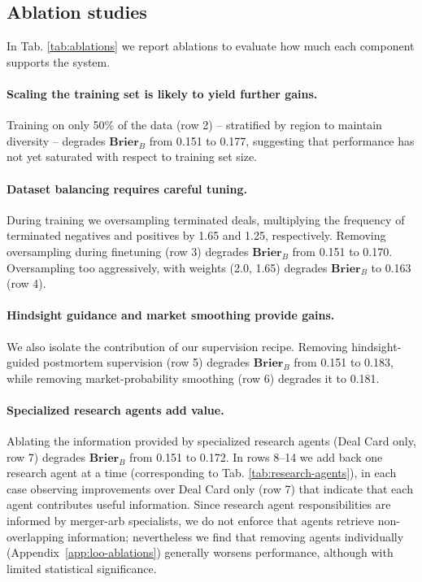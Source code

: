 \documentclass{article}
\theoremstyle{plain}
\theoremstyle{definition}
\theoremstyle{remark}
\begin{document}
\subsection{Ablation studies}
\label{sec:ablations}

In Tab. \ref{tab:ablations} we report ablations to evaluate how much each component supports the system. 

\paragraph{Scaling the training set is likely to yield further gains.}
Training on only 50\% of the data (row 2) -- stratified by region to maintain diversity -- degrades $\textbf{Brier}_B$ from 0.151 to 0.177, suggesting that performance has not yet saturated with respect to training set size.

\paragraph{Dataset balancing requires careful tuning.}
During training we oversampling terminated deals, multiplying the frequency of terminated negatives and positives by 1.65 and 1.25,
respectively. Removing oversampling during finetuning (row 3) degrades $\textbf{Brier}_B$ from 0.151 to 0.170. Oversampling too aggressively, with weights (2.0, 1.65) degrades $\textbf{Brier}_B$ to 0.163 (row 4).

\paragraph{Hindsight guidance and market smoothing provide gains.}
We also isolate the contribution of our supervision recipe. Removing hindsight-guided postmortem supervision (row 5) degrades $\mathbf{Brier}_B$ from 0.151 to 0.183, while removing market-probability smoothing (row 6) degrades it to 0.181.

\paragraph{Specialized research agents add value.}
Ablating the information provided by specialized research agents (Deal Card only, row 7) degrades $\textbf{Brier}_B$ from 0.151 to 0.172. In rows 8--14 we add back one research agent at a time (corresponding to Tab. \ref{tab:research-agents}), in each case observing improvements over Deal Card only (row 7) that indicate that each agent contributes useful information. Since research agent responsibilities are informed by merger-arb specialists, we do not enforce that agents retrieve non-overlapping information; nevertheless we find that removing agents individually (Appendix~\ref{app:loo-ablations}) generally worsens performance, although with limited statistical significance.
\end{document}
